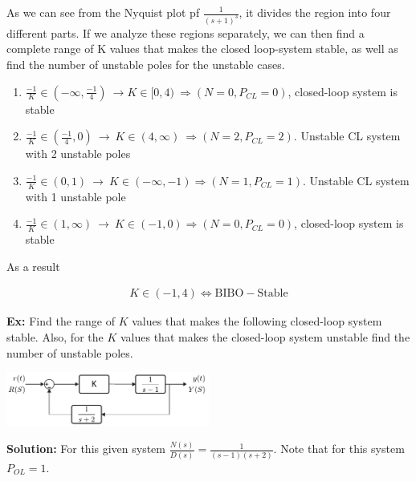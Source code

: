 \documentclass[twoside]{article}
\begin{document}
As we can see from the Nyquist plot pf $\frac{1}{(s+1)^3}$, 
it divides the region into four different parts. If we analyze 
these regions separately, we can then find a complete range of
K values that makes the closed loop-system stable, as well as find the
number of unstable poles for the unstable cases. 
%
\begin{enumerate}
  \item $\frac{-1}{K} \in \left( -\infty , \frac{-1}{4} \right) \
    \rightarrow K \in [0 , 4) \ \Rightarrow ( N = 0 , P_{CL} = 0)$, closed-loop system is stable
%
  \item $ \frac{-1}{K} \in \left( \frac{-1}{4} , 0 \right) \
    \rightarrow \ K \in (4, \infty ) \
    \Rightarrow (N = 2 , P_{CL} = 2)$. Unstable CL system
    with 2 unstable poles
%
    \item $ \frac{-1}{K} \in (0 , 1) \ \rightarrow \ K \in (-\infty , -1)    
\Rightarrow (N = 1 , P_{CL} = 1)$. Unstable CL system
    with 1 unstable pole
%
  \item $\frac{-1}{K} \in (1 , \infty) \ \rightarrow \ K \in (-1,0) 
    \Rightarrow ( N = 0 , P_{CL} = 0)$, closed-loop system is stable
\end{enumerate}

As a result 

\begin{align*}
  K \in (-1 , 4 ) \Leftrightarrow \mathrm{BIBO-Stable}
\end{align*}

\newpage

\textbf{Ex:} Find the range of $K$ values that makes the
following closed-loop system stable. Also, for the $K$ values that 
makes the closed-loop system unstable find the number of unstable poles.

\vspace{6 pt}

  \begin{minipage}[h]{1\linewidth}
    \begin{center}
      \includegraphics[width=0.5\textwidth]{ex4block}
    \end{center}
  \end{minipage}

\vspace{6 pt}

\textbf{Solution:} For this given system $\frac{N(s)}{D(s)} =
\frac{1}{(s-1)(s+2) }$. Note that for this system $P_{OL} = 1$. 
\end{document}
